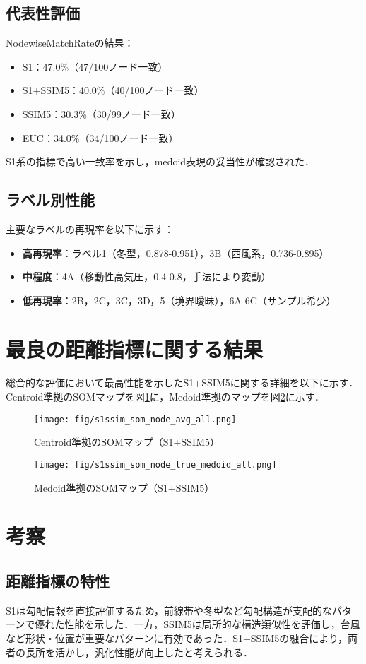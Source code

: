 \documentclass{jarticle}
\theoremstyle{definition}
\begin{document}
\subsection{代表性評価}
NodewiseMatchRateの結果：
\begin{itemize}
\item S1：47.0\%（47/100ノード一致）
\item S1+SSIM5：40.0\%（40/100ノード一致）
\item SSIM5：30.3\%（30/99ノード一致）
\item EUC：34.0\%（34/100ノード一致）
\end{itemize}
S1系の指標で高い一致率を示し，medoid表現の妥当性が確認された．
\subsection{ラベル別性能}
主要なラベルの再現率を以下に示す：
\begin{itemize}
\item \textbf{高再現率}：ラベル1（冬型，0.878-0.951），3B（西風系，0.736-0.895）
\item \textbf{中程度}：4A（移動性高気圧，0.4-0.8，手法により変動）
\item \textbf{低再現率}：2B，2C，3C，3D，5（境界曖昧），6A-6C（サンプル希少）
\end{itemize}
\section{最良の距離指標に関する結果}
総合的な評価において最高性能を示したS1+SSIM5に関する詳細を以下に示す．
Centroid準拠のSOMマップを図\ref{fig:s1ssim_som_node_avg_all}に，Medoid準拠のマップを図\ref{fig:s1ssim_som_node_true_medoid_all}に示す．
\begin{figure}[!t] \centering \texttt{[image: fig/s1ssim\_som\_node\_avg\_all.png]} \caption{Centroid準拠のSOMマップ（S1+SSIM5）} \label{fig:s1ssim_som_node_avg_all} \end{figure}
\begin{figure}[!t] \centering \texttt{[image: fig/s1ssim\_som\_node\_true\_medoid\_all.png]} \caption{Medoid準拠のSOMマップ（S1+SSIM5）} \label{fig:s1ssim_som_node_true_medoid_all} \end{figure}
\section{考察}
\subsection{距離指標の特性}
S1は勾配情報を直接評価するため，前線帯や冬型など勾配構造が支配的なパターンで優れた性能を示した．一方，SSIM5は局所的な構造類似性を評価し，台風など形状・位置が重要なパターンに有効であった．S1+SSIM5の融合により，両者の長所を活かし，汎化性能が向上したと考えられる．
\end{document}
